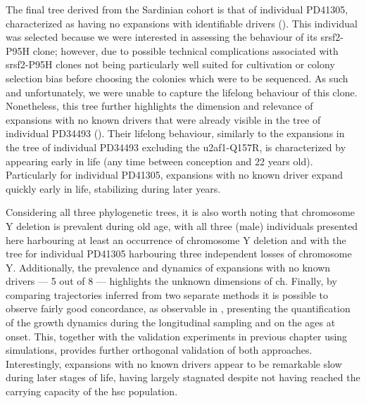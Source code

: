 \begin{figure}[!ht]
	\label{fig:tree-pd34493}
\end{figure}

The final tree derived from the Sardinian cohort is that of individual PD41305, characterized as having no expansions with identifiable drivers (). This individual was selected because we were interested in assessing the behaviour of its \ac{srsf2}-P95H clone; however, due to possible technical complications associated with \ac{srsf2}-P95H clones not being particularly well suited for cultivation or colony selection bias before choosing the colonies which were to be sequenced. As such and unfortunately, we were unable to capture the lifelong behaviour of this clone. Nonetheless, this tree further highlights the dimension and relevance of expansions with no known drivers that were already visible in the tree of individual PD34493 (). Their lifelong behaviour, similarly to the expansions in the tree of individual PD34493 excluding the \ac{u2af1}-Q157R, is characterized by appearing early in life (any time between conception and 22 years old). Particularly for individual PD41305, expansions with no known driver expand quickly early in life, stabilizing during later years.

\begin{figure}[!ht]
	\label{fig:tree-pd41305}
\end{figure}

Considering all three phylogenetic trees, it is also worth noting that chromosome Y deletion is prevalent during old age, with all three (male) individuals presented here harbouring at least an occurrence of chromosome Y deletion and with the tree for individual PD41305 harbouring three independent losses of chromosome Y. Additionally, the prevalence and dynamics of expansions with no known drivers --- 5 out of 8 --- highlights the unknown dimensions of \ac{ch}. Finally, by comparing trajectories inferred from two separate methods it is possible to observe fairly good concordance, as observable in , presenting the quantification of the growth dynamics during the longitudinal sampling and on the ages at onset. This, together with the validation experiments in previous chapter using simulations, provides further orthogonal validation of both approaches. Interestingly, expansions with no known drivers appear to be remarkable slow during later stages of life, having largely stagnated despite not having reached the carrying capacity of the \ac{hsc} population.

